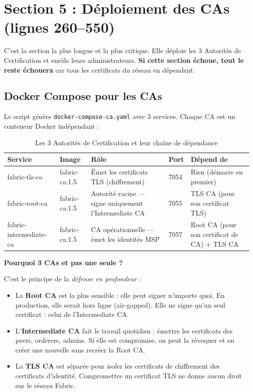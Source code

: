 \documentclass[12pt,a4paper,twoside]{report}
\begin{document}
\section{Section 5 : Déploiement des CAs (lignes 260--550)}

C'est la section la plus longue et la plus critique. Elle déploie les 3 Autorités de Certification et enrôle leurs administrateurs. \textbf{Si cette section échoue, tout le reste échouera} car tous les certificats du réseau en dépendent.

\subsection{Docker Compose pour les CAs}

Le script génère \texttt{docker-compose-ca.yaml} avec 3 services. Chaque CA est un conteneur Docker indépendant :

\begin{table}[H]
\centering
\begin{tabularx}{\textwidth}{llXlp{3cm}}
\toprule
\textbf{Service} & \textbf{Image} & \textbf{Rôle} & \textbf{Port} & \textbf{Dépend de} \\
\midrule
fabric-tls-ca & fabric-ca:1.5 & Émet les certificats TLS (chiffrement) & 7054 & Rien (démarre en premier) \\
fabric-root-ca & fabric-ca:1.5 & Autorité racine --- signe uniquement l'Intermediate CA & 7055 & TLS CA (pour son certificat TLS) \\
fabric-intermediate-ca & fabric-ca:1.5 & CA opérationnelle --- émet les identités MSP & 7057 & Root CA (pour son certificat de CA) + TLS CA \\
\bottomrule
\end{tabularx}
\caption{Les 3 Autorités de Certification et leur chaîne de dépendance}
\end{table}

\begin{infobox}
\textbf{Pourquoi 3 CAs et pas une seule ?}

C'est le principe de la \textit{défense en profondeur} :
\begin{itemize}
    \item La \textbf{Root CA} est la plus sensible : elle peut signer n'importe quoi. En production, elle serait hors ligne (air-gapped). Elle ne signe qu'un seul certificat : celui de l'Intermediate CA.
    \item L'\textbf{Intermediate CA} fait le travail quotidien : émettre les certificats des peers, orderers, admins. Si elle est compromise, on peut la révoquer et en créer une nouvelle sans recréer la Root CA.
    \item La \textbf{TLS CA} est séparée pour isoler les certificats de chiffrement des certificats d'identité. Compromettre un certificat TLS ne donne aucun droit sur le réseau Fabric.
\end{itemize}
\end{infobox}
\end{document}
